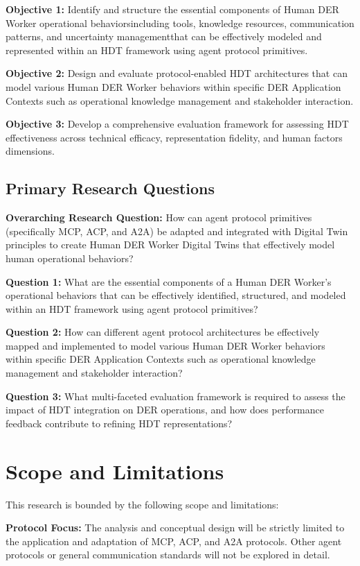 \documentclass[12pt,a4paper]{article}
\newcommand{\emdash}{\textemdash}
\begin{document}
\textbf{Objective 1:} Identify and structure the essential components of Human DER Worker operational behaviors\emdash{}including tools, knowledge resources, communication patterns, and uncertainty management\emdash{}that can be effectively modeled and represented within an HDT framework using agent protocol primitives.

\textbf{Objective 2:} Design and evaluate protocol-enabled HDT architectures that can model various Human DER Worker behaviors within specific DER Application Contexts such as operational knowledge management and stakeholder interaction.

\textbf{Objective 3:} Develop a comprehensive evaluation framework for assessing HDT effectiveness across technical efficacy, representation fidelity, and human factors dimensions.

\subsection{Primary Research Questions}

\textbf{Overarching Research Question:} How can agent protocol primitives (specifically MCP, ACP, and A2A) be adapted and integrated with Digital Twin principles to create Human DER Worker Digital Twins that effectively model human operational behaviors?

\textbf{Question 1:} What are the essential components of a Human DER Worker's operational behaviors that can be effectively identified, structured, and modeled within an HDT framework using agent protocol primitives?

\textbf{Question 2:} How can different agent protocol architectures be effectively mapped and implemented to model various Human DER Worker behaviors within specific DER Application Contexts such as operational knowledge management and stakeholder interaction?

\textbf{Question 3:} What multi-faceted evaluation framework is required to assess the impact of HDT integration on DER operations, and how does performance feedback contribute to refining HDT representations?

\section{Scope and Limitations}
\label{sec:scope}

This research is bounded by the following scope and limitations:

\textbf{Protocol Focus:} The analysis and conceptual design will be strictly limited to the application and adaptation of MCP, ACP, and A2A protocols. Other agent protocols or general communication standards will not be explored in detail.
\end{document}
